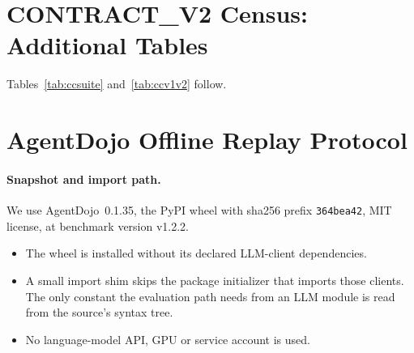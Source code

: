 \documentclass{article}
\begin{document}
\begin{table}[h]
\caption{AgentDojo 0.1.35, benchmark v1.2.2: tasks enumerated from the
package registry.}
\label{tab:adjcensus}
\centering\small

\end{table}

\begin{table}[h]
\caption{Binder-only clairvoyant ceiling on AgentDojo v1.2.2 (all user tasks
in the denominator; unresolved tasks counted as gap $0$ / $1$).
\textsc{oracle\_plan\_conditional}; offline replay, no language model.}
\label{tab:adjh}
\centering\scriptsize

\end{table}

\clearpage
\section{CONTRACT\_V2 Census: Additional Tables}
\label{app:v2}
Tables~\ref{tab:ccsuite} and~\ref{tab:ccv1v2} follow.
\begin{table}[htbp]
\caption{CONTRACT\_V2 per suite (fallback arm, typed resolver, official
channel). Gap$>0$: tasks with positive lower gap; Undet.: tasks with
capped searches; Sel.\ fail.: selectable-failure variants; Not refuted: by
the first-write identifiability screen (a necessary condition only), with
the number of vacuous rows (no other variant shares the first-write view) in
parentheses.}
\label{tab:ccsuite}
\centering\small

\end{table}

\begin{table}[htbp]
\caption{V1 versus V2 contract. The V1 contract was derived from hidden
ground truth and is not deployable; the rows are not a like-for-like
comparison of the same contract. Executed attacks: official channel, injected
variants of resolved tasks.}
\label{tab:ccv1v2}
\centering\small

\end{table}

\section{AgentDojo Offline Replay Protocol}
\label{app:protocol}

\paragraph{Snapshot and import path.}
We use AgentDojo~0.1.35, the PyPI wheel with sha256 prefix
\texttt{364bea42}, MIT license, at benchmark version v1.2.2.
\begin{itemize}
\item The wheel is installed without its declared LLM-client dependencies.
\item A small import shim skips the package initializer that imports those
clients. The only constant the evaluation path needs from an LLM module is
read from the source's syntax tree.
\item No language-model API, GPU or service account is used.
\end{itemize}
\end{document}
